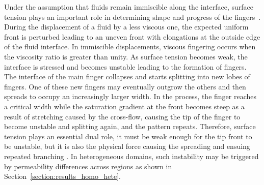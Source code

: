\documentclass[preprint,authoryear,12pt]{elsarticle}
\newcommand{\ie}{{\it i.e., }}
\begin{document}
 Under the assumption that fluids remain immiscible along the interface, surface tension plays an important role in determining shape and progress of the fingers~\citep{howison_2000}. During the displacement of a fluid by a less viscous one, the expected uniform front \citep{buckley_1942,sheldon_1959} is perturbed leading to an uneven front with elongations at the outside edge of the fluid interface. %
In immiscible displacements, viscous fingering occurs when the viscosity ratio is greater than unity. As surface tension becomes weak, the interface is stressed and becomes unstable leading to the formation of fingers. %
The interface of the main finger collapses and starts splitting into new lobes of fingers. One of these new fingers may eventually outgrow the others and then spreads to occupy an increasingly larger width. In the process, the finger reaches a critical width while the saturation gradient at the front becomes steep as a result of stretching caused by the cross-flow, causing the tip of the finger to become unstable and splitting again, and the pattern repeats. Therefore, surface tension plays an essential dual role, it must be weak enough for the tip front to be unstable, but it is also the physical force causing the spreading and ensuing repeated branching \citep{tan_1988, carvalho_2013}. In heterogeneous domains, such instability may be triggered by permeability differences across regions as shown in Section~\ref{section:results_homo_hete}. %
\end{document}
